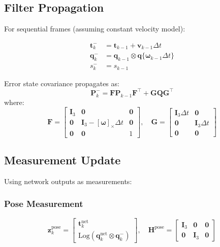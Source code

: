 \subsection{Filter Propagation}
For sequential frames (assuming constant velocity model):

\begin{equation}
	\begin{aligned}
		\mathbf{t}_k^- &= \mathbf{t}_{k-1} + \mathbf{v}_{k-1}\Delta t \\
		\mathbf{q}_k^- &= \mathbf{q}_{k-1} \otimes \mathbf{q}\{\boldsymbol{\omega}_{k-1}\Delta t\} \\
		s_k^- &= s_{k-1}
	\end{aligned}
\end{equation}

Error state covariance propagates as:
\begin{equation}
	\mathbf{P}_k^- = \mathbf{F}\mathbf{P}_{k-1}\mathbf{F}^\top + \mathbf{G}\mathbf{Q}\mathbf{G}^\top
\end{equation}
where:
\begin{equation}
	\mathbf{F} = \begin{bmatrix}
		\mathbf{I}_3 & \mathbf{0} & \mathbf{0} \\
		\mathbf{0} & \mathbf{I}_3 - [\boldsymbol{\omega}]_\times\Delta t & \mathbf{0} \\
		\mathbf{0} & \mathbf{0} & 1
	\end{bmatrix}, \quad
	\mathbf{G} = \begin{bmatrix}
		\mathbf{I}_3\Delta t & \mathbf{0} \\
		\mathbf{0} & \mathbf{I}_3\Delta t \\
		\mathbf{0} & \mathbf{0}
	\end{bmatrix}
\end{equation}

\subsection{Measurement Update}
Using network outputs as measurements:

\subsubsection{Pose Measurement}
\begin{equation}
	\mathbf{z}_k^{\text{pose}} = \begin{bmatrix}
		\mathbf{t}_k^{\text{net}} \\ \text{Log}(\mathbf{q}_k^{\text{net}} \otimes \mathbf{q}_k^{-})
	\end{bmatrix}, \quad
	\mathbf{H}^{\text{pose}} = \begin{bmatrix}
		\mathbf{I}_3 & \mathbf{0} & \mathbf{0} \\
		\mathbf{0} & \mathbf{I}_3 & \mathbf{0}
	\end{bmatrix}
\end{equation}

